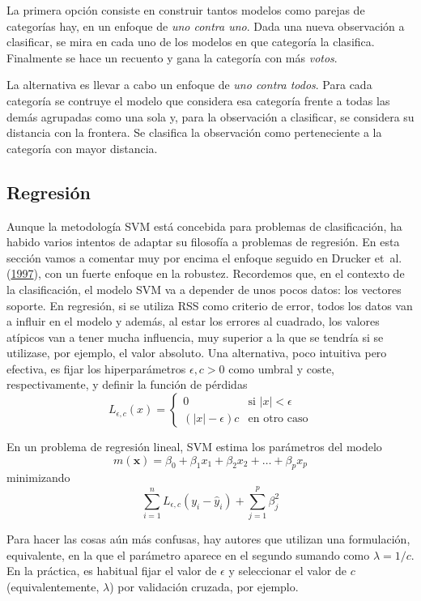 \documentclass[
  spanish,
]{book}
\theoremstyle{break}
\theoremstyle{definition}
\theoremstyle{definition}
\theoremstyle{definition}
\theoremstyle{remark}
\begin{document}
La primera opción consiste en construir tantos modelos como parejas de categorías hay, en un enfoque de \emph{uno contra uno}. Dada una nueva observación a clasificar, se mira en cada uno de los modelos en que categoría la clasifica. Finalmente se hace un recuento y gana la categoría con más \emph{votos}.

La alternativa es llevar a cabo un enfoque de \emph{uno contra todos}. Para cada categoría se contruye el modelo que considera esa categoría frente a todas las demás agrupadas como una sola y, para la observación a clasificar, se considera su distancia con la frontera. Se clasifica la observación como perteneciente a la categoría con mayor distancia.

\hypertarget{regresiuxf3n}{%
\subsection{Regresión}\label{regresiuxf3n}}

Aunque la metodología SVM está concebida para problemas de clasificación, ha habido varios intentos de adaptar su filosofía a problemas de regresión. En esta sección vamos a comentar muy por encima el enfoque seguido en Drucker et~al. (\protect\hyperlink{ref-drucker1997support}{1997}), con un fuerte enfoque en la robustez. Recordemos que, en el contexto de la clasificación, el modelo SVM va a depender de unos pocos datos: los vectores soporte. En regresión, si se utiliza RSS como criterio de error, todos los datos van a influir en el modelo y además, al estar los errores al cuadrado, los valores atípicos van a tener mucha influencia, muy superior a la que se tendría si se utilizase, por ejemplo, el valor absoluto. Una alternativa, poco intuitiva pero efectiva, es fijar los hiperparámetros \(\epsilon,c > 0\) como umbral y coste, respectivamente, y definir la función de pérdidas
\[
L_{\epsilon,c} (x) = \left\{ \begin{array}{ll}
  0 & \mbox{si } |x|< \epsilon \\
  (|x| - \epsilon)c & \mbox{en otro caso}
  \end{array}
  \right.
\]

En un problema de regresión lineal, SVM estima los parámetros del modelo
\[m(\mathbf{x}) = \beta_0 + \beta_1 x_1 + \beta_2 x_2 + \ldots + \beta_p x_p\]
minimizando
\[\sum_{i=1}^n L_{\epsilon,c} (y_i - \hat y_i) + \sum_{j=1}^p \beta_j^2\]

Para hacer las cosas aún más confusas, hay autores que utilizan una formulación, equivalente, en la que el parámetro aparece en el segundo sumando como \(\lambda = 1/c\). En la práctica, es habitual fijar el valor de \(\epsilon\) y seleccionar el valor de \(c\) (equivalentemente, \(\lambda\)) por validación cruzada, por ejemplo.
\end{document}

